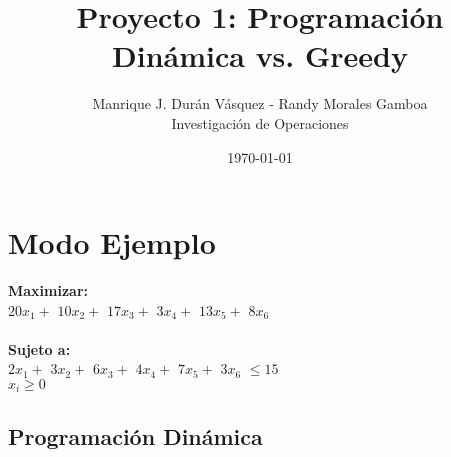\documentclass[12pt]{article}
\title{Proyecto 1: Programaci\'on Din\'amica vs. Greedy}
\author{Manrique J. Dur\'an V\'asquez - Randy Morales Gamboa\\Investigaci\'on de Operaciones\\}
\date{\today}
\newcommand\tab[1][1cm]{\hspace*{#1}}
\begin{document}
\maketitle
\pagebreak

\section*{Modo Ejemplo}

\textbf{Maximizar:} \\
\tab$20x_{1} + $ $10x_{2} + $ $17x_{3} + $ $3x_{4} + $ $13x_{5} + $ $8x_{6}   $ \\\\
\textbf{Sujeto a:}\\
\tab$2x_{1} + $ $3x_{2} + $ $6x_{3} + $ $4x_{4} + $ $7x_{5} + $ $3x_{6}   $ $\leq 15$\\
\tab$x_i \geq 0$\subsection*{Programaci\'on Din\'amica}
\end{document}
